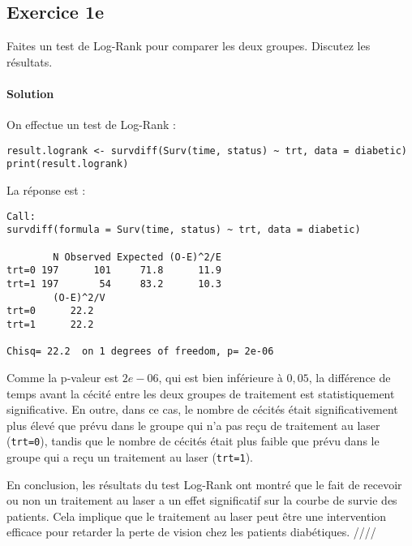\documentclass[../main.tex]{subfiles}
\begin{document}
\begin{CJK*}{UTF8}{gbsn}

\section*{Exercice 1e}
Faites un test de Log-Rank pour comparer les deux groupes. Discutez les résultats.
    
\paragraph{Solution}
On effectue un test de Log-Rank :
    
\begin{lstlisting}
result.logrank <- survdiff(Surv(time, status) ~ trt, data = diabetic)
print(result.logrank)
\end{lstlisting}

La réponse est :

\begin{lstlisting}
Call:
survdiff(formula = Surv(time, status) ~ trt, data = diabetic)
    
        N Observed Expected (O-E)^2/E
trt=0 197      101     71.8      11.9
trt=1 197       54     83.2      10.3
        (O-E)^2/V
trt=0      22.2
trt=1      22.2
    
Chisq= 22.2  on 1 degrees of freedom, p= 2e-06 
\end{lstlisting}

Comme la p-valeur est $2e-06$, qui est bien inférieure à $0,05$,
 la différence de temps avant la cécité entre les deux 
groupes de traitement est statistiquement significative. 
En outre, dans ce cas, le nombre de cécités était significativement 
plus élevé que prévu dans le groupe qui n'a pas reçu de traitement au laser 
(\texttt{trt=0}), tandis que le nombre de cécités était plus faible que prévu 
dans le groupe qui a reçu un traitement au laser (\texttt{trt=1}).
    
En conclusion, les résultats du test Log-Rank ont 
montré que le fait de recevoir ou non un traitement 
au laser a un effet significatif sur la courbe 
de survie des patients. Cela implique que le 
traitement au laser peut être une intervention 
efficace pour retarder la perte de vision chez les patients diabétiques. ////

\end{CJK*}
\end{document}
